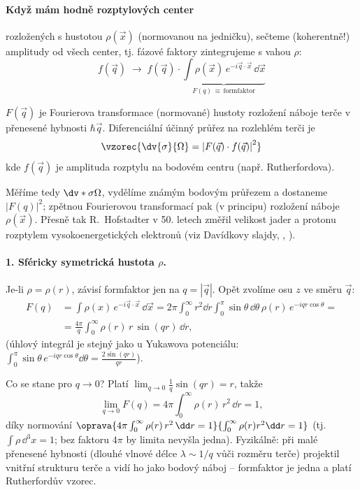 \paragraph{Když mám hodně rozptylových center} rozložených s hustotou $\rho(\vec x)$ (normovanou na jedničku), sečteme (koherentně!) amplitudy od všech center, tj. fázové faktory zintegrujeme s vahou $\rho$:
\begin{equation}
  f(\vec q)\;\longrightarrow\; f(\vec q)\cdot\underbrace{\int\rho(\vec x)\,e^{-i\vec q\cdot\vec x}\,\dd\vec x}_{F(q)\,\equiv\,\text{formfaktor}}
\end{equation}
\begin{definice}[Formfaktor]
 $F(\vec q)$ je Fourierova transformace (normované) hustoty rozložení náboje terče v přenesené hybnosti $\hbar\vec q$. Diferenciální účinný průřez na rozlehlém terči je
\[
  \vzorec{\dv{\sigma}{\Omega} = \left|F(\vec q)\cdot f(\vec q)\right|^2}
\]
kde $f(\vec q)$ je amplituda rozptylu na bodovém centru (např. Rutherfordova).
\end{definice}
Měříme tedy $\dv*{\sigma}{\Omega}$, vydělíme známým bodovým průřezem a dostaneme $|F(q)|^2$; zpětnou Fourierovou transformací pak (v principu) rozložení náboje $\rho(\vec x)$. Přesně tak R.~Hofstadter v 50. letech změřil velikost jader a protonu rozptylem vysokoenergetických elektronů (viz Davídkovy slajdy, , ).

\paragraph{1. Sféricky symetrická hustota $\rho$.} Je-li $\rho=\rho(r)$, závisí formfaktor jen na $q=|\vec q|$. Opět zvolíme osu $z$ ve směru $\vec q$:
\begin{align}
  F(q) &= \int\rho(x)\,e^{-i\vec q\cdot\vec x}\,\dd\vec x = 2\pi\int_0^\infty r^2\dd r\int_0^\pi\sin\theta\,\dd\theta\,\rho(r)\,e^{-iqr\cos\theta} = \\
       &= \frac{4\pi}{q}\int_0^\infty\rho(r)\,r\,\sin(qr)\,\dd r ,
\end{align}
(úhlový integrál je stejný jako u Yukawova potenciálu: $\int_0^\pi\sin\theta\, e^{-iqr\cos\theta}\dd\theta = \frac{2\sin(qr)}{qr}$).

Co se stane pro $q\to0$? Platí $\lim_{q\to0}\frac{1}{q}\sin(qr) = r$, takže
\[
  \lim_{q\to0}F(q) = 4\pi\int_0^\infty\rho(r)\,r^2\,\dd r = 1,
\]
díky normování $\oprava{4\pi\int_0^\infty\rho(r)\,r^2\,\dd r = 1}{\int_0^\infty\rho(r)r^2\dd r = 1}$ (tj. $\int\rho\,\dd^3x = 1$; bez faktoru $4\pi$ by limita nevyšla jedna). Fyzikálně: při malé přenesené hybnosti (dlouhé vlnové délce $\lambda\sim1/q$ vůči rozměru terče) projektil vnitřní strukturu terče  a vidí ho jako bodový náboj -- formfaktor je jedna a platí Rutherfordův vzorec.

